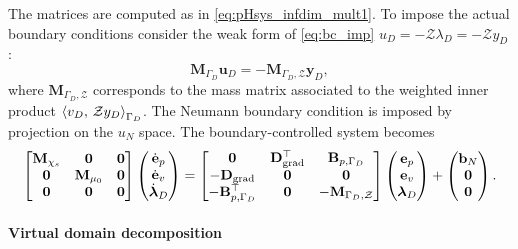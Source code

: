 The matrices are computed as in \eqref{eq:pHsys_infdim_mult1}. To impose the actual boundary conditions consider the weak form of \eqref{eq:bc_imp} $u_D=-\mathcal{Z}\lambda_D=-\mathcal{Z}y_D$ \cite{serhani2019par}:
\[ \mathbf{M}_{\Gamma_D} \mathbf{u}_D = - \mathbf{M}_{\Gamma_D, \mathcal{Z}} {\mathbf{y}}_D,
\]
where $\mathbf{M}_{\Gamma_D, \mathcal{Z}}$ corresponds to the mass matrix associated to the weighted inner product $\inner[\Gamma_D]{v_D}{\mathcal{Z} y_D}$. The Neumann boundary condition is imposed by projection on the $u_N$ space.   The boundary-controlled system becomes   
\begin{equation}\label{eq:pHfindim_waves_phdae_bc}
\begin{bmatrix}
\mathbf{M}_{\chi_s} & \mathbf{0} & \mathbf{0}\\
\mathbf{0} & \mathbf{M}_{\mu_0} & \mathbf{0} \\
\mathbf{0} & \mathbf{0} & \mathbf{0} \\
\end{bmatrix}
\begin{pmatrix}
\dot{\mathbf{e}}_p\\
\dot{\mathbf{e}}_v\\
\dot{\bm{\lambda}}_D \\
\end{pmatrix}
= \begin{bmatrix}
\mathbf{0} & \mathbf{D}_{\grad}^\top & \mathbf{B}_{p, \Gamma_D}\\
-\mathbf{D}_{\grad} & \mathbf{0} & \mathbf{0} \\
-\mathbf{B}_{p, \Gamma_D}^\top & \mathbf{0} & -\mathbf{M}_{\Gamma_D, \mathcal{Z}} \\
\end{bmatrix}
\begin{pmatrix}
{\mathbf{e}}_p\\
{\mathbf{e}}_v\\
{\bm{\lambda}}_D \\
\end{pmatrix} + \begin{pmatrix}
\mathbf{b}_N \\
\mathbf{0}\\
\mathbf{0}\\
\end{pmatrix}.
\end{equation}

\paragraph{Virtual domain decomposition}

